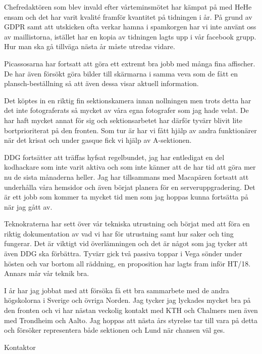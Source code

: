 \documentclass[../_main/handlingar.tex]{subfiles}
\begin{document}
Chefredaktören som blev invald efter vårteminsmötet har kämpat på med HeHe ensam och det har varit kvalité framför kvantitet på tidningen i år. På grund av GDPR samt att utskicken ofta verkar hamna i spamkorgen har vi inte använt oss av maillistorna, istället har en kopia av tidningen lagts upp i vår facebook grupp. Hur man ska gå tillväga nästa år måste utredas vidare.

Picassosarna har fortsatt att göra ett extremt bra jobb med många fina affischer. De har även försökt göra bilder till skärmarna i samma veva som de fått en plansch-beställning så att även dessa visar aktuell information.

Det köptes in en riktig fin sektionskamera innan nollningen men trots detta har det inte fotograferats så mycket av våra egna fotografer som jag hade velat. De har haft mycket annat för sig och sektionsarbetet har därför tyvärr blivit lite bortprioriterat på den fronten. Som tur är har vi fått hjälp av andra funktionärer när det krisat och under gasque fick vi hjälp av A-sektionen.

DDG fortsätter att träffas hyfsat regelbundet, jag har entledigat en del kodhackare som inte varit aktiva och som inte känner att de har tid att göra mer nu de sista månaderna heller. 
Jag har tillsammans med Macapären fortsatt att underhålla våra hemsidor och även börjat planera för en serveruppgradering. Det är ett jobb som kommer ta mycket tid men som jag hoppas kunna fortsätta på när jag gått av.

Teknokraterna har sett över vår tekniska utrustning och börjat med att föra en riktig dokumentation av vad vi har för utrustning samt hur saker och ting fungerar. Det är viktigt vid överlämningen och det är något som jag tycker att även DDG ska förbättra.
Tyvärr gick två passiva toppar i Vega sönder under hösten och var bortom all räddning, en proposition har lagts fram inför HT/18. Annars mår vår teknik bra.  

I år har jag jobbat med att försöka få ett bra sammarbete med de andra högskolorna i Sverige och övriga Norden. Jag tycker jag lyckades mycket bra på den fronten och vi har nästan veckolig kontakt med KTH och Chalmers men även med Trondheim och Aalto. Jag hoppas att nästa års styrelse tar till vara på detta och försöker representera både sektionen och Lund när chansen väl ges. 

\begin{signatures}{1}
    \mvh
    \signature{\sekr}{Kontaktor}
\end{signatures}
\end{document}
